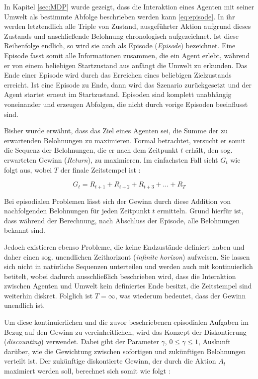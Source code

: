 In Kapitel \ref{sec:MDP} wurde gezeigt, dass die Interaktion eines Agenten mit seiner Umwelt als bestimmte Abfolge beschrieben werden kann \eqref{eq:episode}. In ihr werden letztendlich alle Triple von Zustand, ausgeführter Aktion aufgrund dieses Zustands und anschließende Belohnung chronologisch aufgezeichnet. Ist diese Reihenfolge endlich, so wird sie auch als Episode (\textit{Episode}) bezeichnet. Eine Episode fasst somit alle Informationen zusammen, die ein Agent erlebt, während er von einem beliebigen Startzustand aus anfängt die Umwelt zu erkunden. Das Ende einer Episode wird durch das Erreichen eines beliebigen Zielzustands erreicht. Ist eine Episode zu Ende, dann wird das Szenario zurückgesetzt und der Agent startet erneut im Startzustand. Episoden sind komplett unabhängig voneinander und erzeugen Abfolgen, die nicht durch vorige Episoden beeinflusst sind.
\par
Bisher wurde erwähnt, dass das Ziel eines Agenten sei, die Summe der zu erwartenden Belohnungen zu maximieren. Formal betrachtet, versucht er somit die Sequenz der Belohnungen, die er nach dem Zeitpunkt $t$ erhält, den sog. erwarteten Gewinn (\textit{Return}), zu maximieren. Im einfachsten Fall sieht $G_t$ wie folgt aus, wobei $T$ der finale Zeitstempel ist \cite[S.55]{Sutton1998}:

\begin{equation}\label{eq:simpleReturn}
    G_t = R_{t+1} + R_{t+2} + R_{t+3} + \dots + R_{T}
\end{equation}

Bei episodialen Problemen lässt sich der Gewinn durch diese Addition von nachfolgenden Belohnungen für jeden Zeitpunkt $t$ ermitteln. Grund hierfür ist, dass während der Berechnung, nach Abschluss der Episode, alle Belohnungen bekannt sind. 
\par 
Jedoch existieren ebenso Probleme, die keine Endzustände definiert haben und daher einen sog. unendlichen Zeithorizont (\textit{infinite horizon}) aufweisen. Sie lassen sich nicht in natürliche Sequenzen unterteilen und werden auch mit \glqq kontinuierlich\grqq{} betitelt, wobei dadurch ausschließlich beschrieben wird, dass die Interaktion zwischen Agenten und Umwelt kein definiertes Ende besitzt, die Zeitstempel sind weiterhin diskret. Folglich ist $T=\infty$, was wiederum bedeutet, dass der Gewinn unendlich ist.
\par 
Um diese kontinuierlichen und die zuvor beschriebenen episodialen Aufgaben im Bezug auf den Gewinn zu vereinheitlichen, wird das Konzept der Diskontierung (\textit{discounting}) verwendet. Dabei gibt der Parameter $\gamma$, $0\leq \gamma \leq 1$, Auskunft darüber, wie die Gewichtung zwischen sofortigen und zukünftigen Belohnungen verteilt ist. Der zukünftige diskontierte Gewinn, der durch die Aktion $A_t$ maximiert werden soll, berechnet sich somit wie folgt \cite[S.55]{Sutton1998}:

